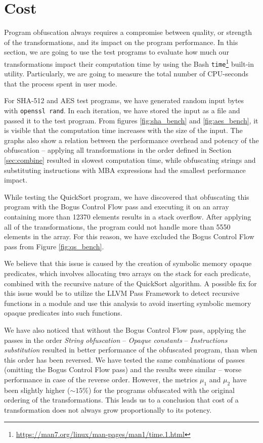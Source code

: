 \documentclass[
  digital, %
  notable,   %
  twoside, %
  nolof,     %
  nolot,     %
]{fithesis3}
\theoremstyle{definition}
\begin{document}
\section{Cost}
Program obfuscation always requires a compromise between quality, or strength of the transformations, and its impact on the program performance. In this section, we are going to use the test programs to evaluate how much our transformations impact their computation time by using the Bash \texttt{time}\footnote{\url{https://man7.org/linux/man-pages/man1/time.1.html}} built-in utility. Particularly, we are going to measure the total number of CPU-seconds that the process spent in user mode. 

For SHA-512 and AES test programs, we have generated random input bytes with \texttt{openssl rand}. In each iteration, we have stored the input as a file and passed it to the test program. From figures \ref{fig:sha_bench} and \ref{fig:aes_bench}, it is visible that the computation time increases with the size of the input. The graphs also show a relation between the performance overhead and potency of the obfuscation -- applying all transformations in the order defined in Section \ref{sec:combine} resulted in slowest computation time, while obfuscating strings and substituting instructions with MBA expressions had the smallest performance impact. 

While testing the QuickSort program, we have discovered that obfuscating this program with the Bogus Control Flow pass and executing it on an array containing more than 12370 elements results in a stack overflow. After applying all of the transformations, the program could not handle more than 5550 elements in the array. For this reason, we have excluded the Bogus Control Flow pass from Figure \ref{fig:qs_bench}.

We believe that this issue is caused by the creation of symbolic memory opaque predicates, which involves allocating two arrays on the stack for each predicate, combined with the recursive nature of the QuickSort algorithm. A possible fix for this issue would be to utilize the LLVM Pass Framework to detect recursive functions in a module and use this analysis to avoid inserting symbolic memory opaque predicates into such functions.

We have also noticed that without the Bogus Control Flow pass, applying the passes in the order \textit{String obfuscation} -- \textit{Opaque constants} -- \textit{Instructions substitution} resulted in better performance of the obfuscated program, than when this order has been reversed. We have tested the same combinations of passes (omitting the Bogus Control Flow pass) and the results were similar -- worse performance in case of the reverse order. However, the metrics $\mu_1$ and $\mu_2$ have been slightly higher ($\sim15\%$) for the programs obfuscated with the original ordering of the transformations. This leads us to a conclusion that cost of a transformation does not always grow proportionally to its potency.
\end{document}
